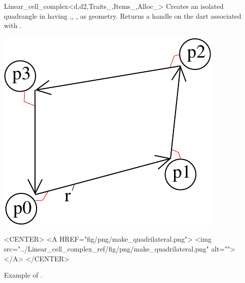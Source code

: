 \begin{ccRefClass}{Linear_cell_complex<d,d2,Traits_,Items_,Alloc_>}
{Creates an isolated quadrangle in   having  ,, 
  ,  as geometry.
   Returns a handle on the dart associated with .
}
%
\def\LargFig{.3\textwidth}
  \begin{ccTexOnly}
    \begin{center}
      \includegraphics[width=\LargFig]{Linear_cell_complex_ref/fig/pdf/make_quadrilateral}
    \end{center}
  \end{ccTexOnly}
  \begin{ccHtmlOnly}
    <CENTER>
    <A HREF="fig/png/make_quadrilateral.png">
        <img src="../Linear_cell_complex_ref/fig/png/make_quadrilateral.png" alt=""></A>
    </CENTER>
    \end{ccHtmlOnly}
    \centerline{Example of .}


\end{ccRefClass}
